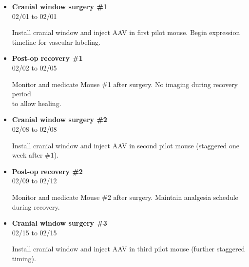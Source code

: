 \documentclass[landscape,a4paper]{article}
\begin{document}
\begin{itemize}[leftmargin=1cm, itemsep=0.8em]
    \item \textcolor{other}{\textbf{Cranial window surgery \#1}}\\[0.2em]
          \textcolor{black!70}{\small 02/01 to 02/01}
\\[0.3em]
          \begin{minipage}[t]{0.85\textwidth}
          \textcolor{black!80}{Install cranial window and inject AAV in first pilot mouse. Begin expression\\[0.1em]
          timeline for vascular labeling.}
          \end{minipage}

    \item \textcolor{other}{\textbf{Post-op recovery \#1}}\\[0.2em]
          \textcolor{black!70}{\small 02/02 to 02/05}
\\[0.3em]
          \begin{minipage}[t]{0.85\textwidth}
          \textcolor{black!80}{Monitor and medicate Mouse \#1 after surgery. No imaging during recovery period\\[0.1em]
          to allow healing.}
          \end{minipage}

    \item \textcolor{other}{\textbf{Cranial window surgery \#2}}\\[0.2em]
          \textcolor{black!70}{\small 02/08 to 02/08}
\\[0.3em]
          \begin{minipage}[t]{0.85\textwidth}
          \textcolor{black!80}{Install cranial window and inject AAV in second pilot mouse (staggered one\\[0.1em]
          week after \#1).}
          \end{minipage}

    \item \textcolor{other}{\textbf{Post-op recovery \#2}}\\[0.2em]
          \textcolor{black!70}{\small 02/09 to 02/12}
\\[0.3em]
          \begin{minipage}[t]{0.85\textwidth}
          \textcolor{black!80}{Monitor and medicate Mouse \#2 after surgery. Maintain analgesia schedule during recovery.}
          \end{minipage}

    \item \textcolor{other}{\textbf{Cranial window surgery \#3}}\\[0.2em]
          \textcolor{black!70}{\small 02/15 to 02/15}
\\[0.3em]
          \begin{minipage}[t]{0.85\textwidth}
          \textcolor{black!80}{Install cranial window and inject AAV in third pilot mouse (further staggered\\[0.1em]
          timing).}
          \end{minipage}


\end{itemize}
\end{document}

